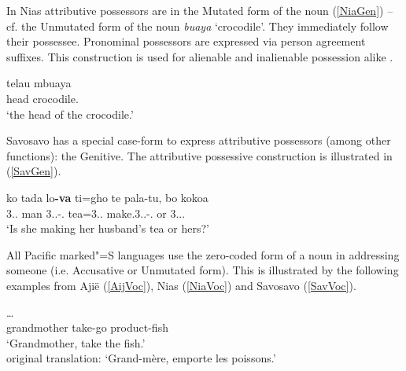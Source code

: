 In Nias attributive possessors are in the Mutated form of the noun (\ref{NiaGen}) -- cf. the Unmutated form of the noun \emph{buaya} `crocodile'. %
They immediately follow their possessee. Pronominal possessors are expressed via person agreement suffixes. 
This construction is used for alienable and inalienable possession alike \citep[374]{Brown:2001}.

\begin{exe}
\ex\label{NiaGen}
\gll telau mbuaya\\
head crocodile.\mut{}\\
\glt `the head of the crocodile.'
\end{exe}

Savosavo has a special case-form to express attributive possessors (among other functions): the Genitive.
The attributive possessive construction is illustrated in (\ref{SavGen}).
\enlargethispage{\baselineskip}
\begin{exe}\ex\label{SavGen}
\raggedright
\gll ko tada lo\textbf{-va} ti=gho te pala-tu, bo kokoa\\
3\sg{}.\fem{}.\gen{} man 3.\sg{}.\mas{}-\gen{}.\mas{} tea=3\sg{}.\fem{}.\nom{} \emphat{} make.3\sg{}.\mas.\obj-\prs.\ipfv{} or 3\sg{}.\fem{}.\poss{}.\mas{}\\
\glt `Is she making her husband's tea or hers?'
\end{exe}

All Pacific marked"=S languages use the zero-coded form of a noun in addressing someone (i.e. Accusative or Unmutated form).
This is illustrated by the following examples from Aji\"e (\ref{AijVoc}), Nias (\ref{NiaVoc}) and Savosavo (\ref{SavVoc}).

\pagebreak
\begin{exe}\ex\label{AijVoc}
\gll\textbf{}    \dots\\
grandmother take-go \pl{} product-fish\\
\glt `Grandmother, take the fish.'\\
 original translation: `Grand-m\`ere, emporte les poissons.'
\end{exe}

